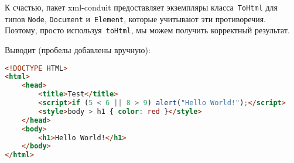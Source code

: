 К счастью, пакет xml-conduit предоставляет экземпляры класса~\lstinline!ToHtml!
для типов \lstinline!Node!, \lstinline!Document! и~\lstinline!Element!, которые
учитывают эти противоречия. Поэтому, просто используя~\lstinline'toHtml', мы
можем получить корректный результат.


Выводит (пробелы добавлены вручную):

\begin{lstlisting}[language=HTML]
<!DOCTYPE HTML>
<html>
    <head>
        <title>Test</title>
        <script>if (5 < 6 || 8 > 9) alert("Hello World!");</script>
        <style>body > h1 { color: red }</style>
    </head>
    <body>
        <h1>Hello World!</h1>
    </body>
</html>
\end{lstlisting}%
